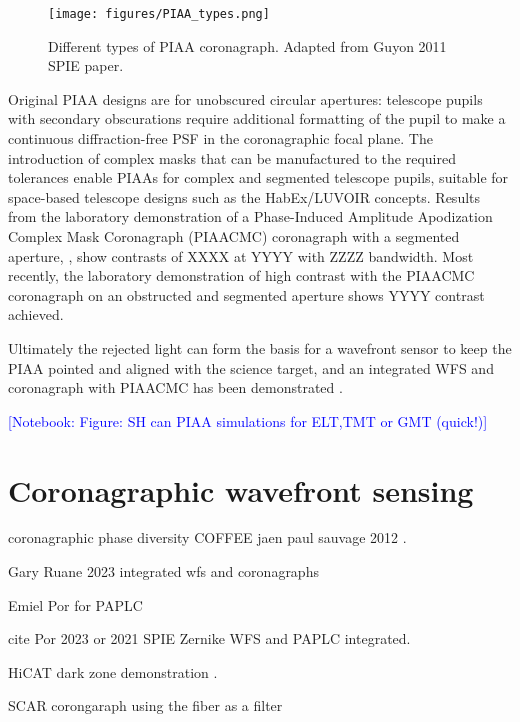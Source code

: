 \documentclass[letterpaper]{ar-1col}
\newcommand{\notebooksuggestion}[1]{\textcolor{blue}{[Notebook: #1]}}
\begin{document}
\begin{figure}[ht]
  \centering
  \texttt{[image: figures/PIAA\_types.png]}
  \caption{Different types of PIAA coronagraph. Adapted from Guyon 2011 SPIE paper.}
  \label{fig:piaatypes}
\end{figure}

%
Original PIAA designs are for unobscured circular apertures: telescope pupils with secondary obscurations require additional formatting of the pupil to make a continuous diffraction-free PSF in the coronagraphic focal plane.
%
The introduction of complex masks that can be manufactured to the required tolerances enable PIAAs for complex and segmented telescope pupils, suitable for space-based telescope designs such as the HabEx/LUVOIR concepts.
%
Results from the laboratory demonstration of a Phase-Induced Amplitude Apodization Complex Mask Coronagraph (PIAACMC) coronagraph with a segmented aperture, \citep{Marx21}, show contrasts of XXXX at YYYY with ZZZZ bandwidth.
%
Most recently, the laboratory demonstration of high contrast with the PIAACMC coronagraph on an obstructed and segmented aperture \citep{Belikov22} shows YYYY contrast achieved.

Ultimately the rejected light can form the basis for a wavefront sensor to keep the PIAA pointed and aligned with the science target, and an integrated WFS and coronagraph with PIAACMC has been demonstrated \citep{Haffert23a}.

\notebooksuggestion{Figure: SH can PIAA simulations for ELT,TMT or GMT (quick!)}

\section{Coronagraphic wavefront sensing}
\lipsum[2-4]

coronagraphic phase diversity
COFFEE jaen paul sauvage 2012 \citep{Sauvage12}.


Gary Ruane 2023 integrated wfs and coronagraphs \citep{Ruane23}

Emiel Por for PAPLC \citep{Por20}

cite Por 2023 or 2021 SPIE Zernike WFS and PAPLC integrated. \citep{Pourcelot22,Pourcelot23}

HiCAT dark zone demonstration \citep{Soummer22}.

SCAR corongaraph using the fiber as a filter \citep{Haffert20}
\end{document}
